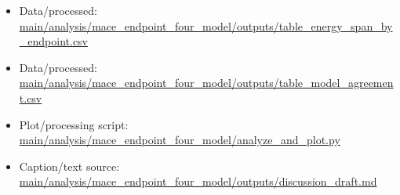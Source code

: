 \begin{itemize}[leftmargin=1.4em,noitemsep]
\item Data/processed: \begingroup\scriptsize\url{main/analysis/mace_endpoint_four_model/outputs/table_energy_span_by_endpoint.csv}\endgroup
\item Data/processed: \begingroup\scriptsize\url{main/analysis/mace_endpoint_four_model/outputs/table_model_agreement.csv}\endgroup
\item Plot/processing script: \begingroup\scriptsize\url{main/analysis/mace_endpoint_four_model/analyze_and_plot.py}\endgroup
\item Caption/text source: \begingroup\scriptsize\url{main/analysis/mace_endpoint_four_model/outputs/discussion_draft.md}\endgroup
\end{itemize}
